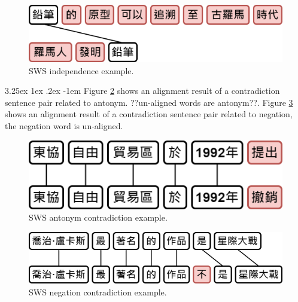 \documentclass[12pt]{article}
\makeatletter
\renewcommand\paragraph{\@startsection{paragraph}{5}{\z@}%
  {3.25ex \@plus1ex \@minus.2ex}%
  {-1em}%
  {\normalfont\normalsize\bfseries}}
\makeatother
\begin{document}
\begin{CJK*}{UTF8}{bkai}
\begin{spacing}{1.77}
\begin{figure}[H]
  \centering
  \includegraphics[scale=0.6]{SWS.I.png}
  \caption[SWS Independence Example]{SWS independence example.}
  \label{fig:sws_i}
\end{figure}

\paragraph{}
Figure \ref{fig:sws_c_antonym} shows an alignment result of a contradiction sentence pair related to antonym. ??un-aligned words are antonym??. Figure \ref{fig:sws_c_neg} shows an alignment result of a contradiction sentence pair related to negation, the negation word is un-aligned.

\begin{figure}[H]
  \centering
  \includegraphics[scale=0.6]{SWS.C.Antonym}
  \caption[SWS Antonym Contradiction Example]{SWS antonym contradiction example.}
  \label{fig:sws_c_antonym}
\end{figure}

\begin{figure}[H]
  \centering
  \includegraphics[scale=0.6]{SWS.C.Negation.png}
  \caption[SWS Negation Contradiction Example]{SWS negation contradiction example.}
  \label{fig:sws_c_neg}
\end{figure}


\end{spacing}
\end{CJK*}
\end{document}

